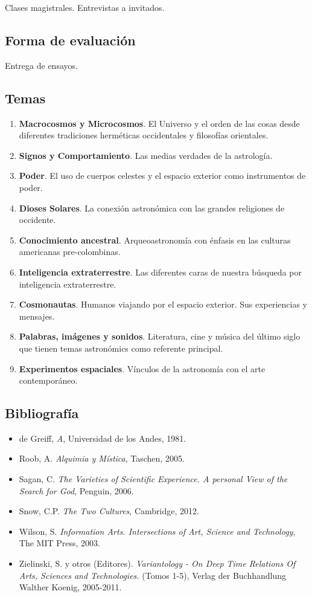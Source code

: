 \documentclass{report}
\begin{document}
Clases magistrales. Entrevistas a invitados.

\subsection*{Forma de evaluaci\'on}

Entrega de ensayos.

\subsection*{Temas}

\begin{enumerate}
\item {\bf Macrocosmos y Microcosmos}. El Universo y el orden de las
  cosas desde diferentes tradiciones herm\'eticas occidentales y
  filosof\'ias orientales.
\item {\bf Signos y Comportamiento}. Las medias verdades de la astrolog\'ia.
\item {\bf Poder}. El uso de cuerpos celestes y el espacio exterior como instrumentos de poder. 
\item {\bf Dioses Solares}. La conexi\'on astron\'omica con las grandes religiones de occidente. 
\item {\bf Conocimiento ancestral}. Arqueoastronom\'ia con \'enfasis en las culturas americanas pre-colombinas.
\item {\bf Inteligencia extraterrestre}. Las diferentes caras de
  nuestra b\'usqueda por inteligencia extraterrestre.
\item {\bf Cosmonautas}. Humanos viajando por el espacio exterior. Sus experiencias y mensajes.
\item {\bf Palabras, im\'agenes y sonidos}. Literatura, cine y
  m\'usica del \'ultimo siglo que tienen temas astron\'omics como
  referente principal.
\item {\bf Experimentos espaciales}. V\'inculos de la astronom\'ia con
  el arte contempor\'aneo.
\end{enumerate}

\subsection*{Bibliografía}

\begin{itemize}
\item de Greiff, \emph{A}, Universidad de los Andes, 1981.
\item Roob, A. \emph{Alquimia y M\'istica}, Taschen, 2005.
\item Sagan, C. \emph{The Varieties of Scientific Experience. A personal View of the Search for God}, Penguin, 2006.
\item Snow, C.P. \emph{The Two Cultures}, Cambridge, 2012.
\item Wilson, S. \emph{Information Arts. Intersections of Art, Science
and Technology}, The MIT Press, 2003.
\item Zielinski, S. y otros (Editores). \emph{Variantology - On Deep Time
  Relations Of Arts, Sciences and Technologies.} (Tomos 1-5), Verlag
der Buchhandlung Walther Koenig, 2005-2011.
\end{itemize}
\end{document}
